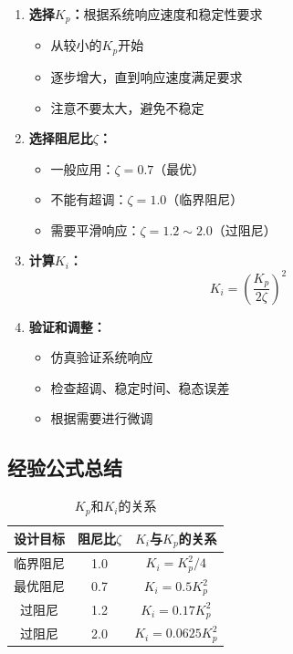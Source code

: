 \documentclass[12pt,a4paper]{article}
\begin{document}
\begin{enumerate}
\item \textbf{选择$K_p$：}根据系统响应速度和稳定性要求
   \begin{itemize}
   \item 从较小的$K_p$开始
   \item 逐步增大，直到响应速度满足要求
   \item 注意不要太大，避免不稳定
   \end{itemize}

\item \textbf{选择阻尼比$\zeta$：}
   \begin{itemize}
   \item 一般应用：$\zeta = 0.7$（最优）
   \item 不能有超调：$\zeta = 1.0$（临界阻尼）
   \item 需要平滑响应：$\zeta = 1.2 \sim 2.0$（过阻尼）
   \end{itemize}

\item \textbf{计算$K_i$：}
   \begin{equation}
   K_i = \left(\frac{K_p}{2\zeta}\right)^2
   \end{equation}

\item \textbf{验证和调整：}
   \begin{itemize}
   \item 仿真验证系统响应
   \item 检查超调、稳定时间、稳态误差
   \item 根据需要进行微调
   \end{itemize}
\end{enumerate}

\subsection{经验公式总结}

\begin{table}[h]
\centering
\begin{tabular}{|c|c|c|}
\hline
\textbf{设计目标} & \textbf{阻尼比$\zeta$} & \textbf{$K_i$与$K_p$的关系} \\
\hline
临界阻尼 & 1.0 & $K_i = K_p^2/4$ \\
\hline
最优阻尼 & 0.7 & $K_i = 0.5 K_p^2$ \\
\hline
过阻尼 & 1.2 & $K_i = 0.17 K_p^2$ \\
\hline
过阻尼 & 2.0 & $K_i = 0.0625 K_p^2$ \\
\hline
\end{tabular}
\caption{$K_p$和$K_i$的关系}
\end{table}
\end{document}
